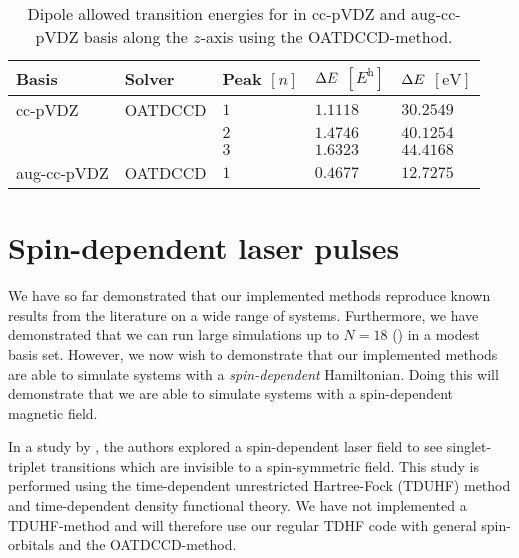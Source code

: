         \begin{table}
            \centering
            \caption{Dipole allowed transition energies for  in cc-pVDZ
            and aug-cc-pVDZ basis along the $z$-axis using the OATDCCD-method.}
            \renewcommand{\arraystretch}{1.3}
            \begin{tabular}{@{}lllll@{}}
                \toprule
                Basis & Solver & Peak $[n]$
                & $\Delta E$ $[\si{\hartree}]$
                & $\Delta E$ $[\si{\electronvolt}]$
                \\
                \midrule
                cc-pVDZ & OATDCCD & $1$ & $1.1118$ & $30.2549$ \\
                & & $2$ & $1.4746$ & $40.1254$ \\
                & & $3$ & $1.6323$ & $44.4168$ \\
                aug-cc-pVDZ & OATDCCD & $1$ & $0.4677$ & $12.7275$ \\
                \bottomrule
            \end{tabular}
            \label{tab:dipole-ar}
        \end{table}

    \section{Spin-dependent laser pulses}
        \label{sec:isborn}
        We have so far demonstrated that our implemented methods reproduce known
        results from the literature on a wide range of systems.
        Furthermore, we have demonstrated that we can run large simulations up to
        $N = 18$ () in a modest basis set.
        However, we now wish to demonstrate that our implemented methods are
        able to simulate systems with a \emph{spin-dependent} Hamiltonian.
        Doing this will demonstrate that we are able to simulate systems with a
        spin-dependent magnetic field.

        In a study by \citeauthor{isborn} \cite{isborn}, the authors explored a
        spin-dependent laser field to see singlet-triplet transitions which are
        invisible to a spin-symmetric field.
        This study is performed using the time-dependent unrestricted
        Hartree-Fock (TDUHF) method and time-dependent density functional theory.
        We have not implemented a TDUHF-method and will therefore use our
        regular TDHF code with general spin-orbitals and the OATDCCD-method.

